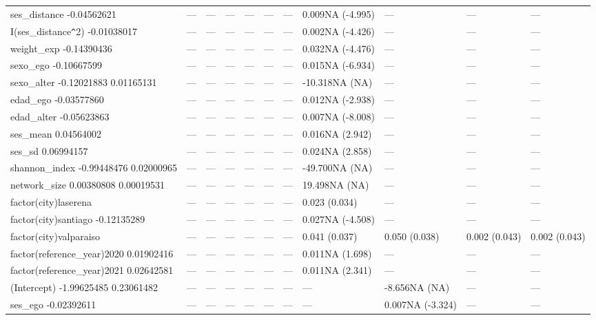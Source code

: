 \begin{table}[ht]
\begin{tabular}{lllllllllll}
  ses\_distance -0.04562621 & --- & --- & --- & --- & --- & --- & 0.009NA (-4.995) & --- & --- & --- \\ 
  I(ses\_distance\verb|^|2) -0.01038017 & --- & --- & --- & --- & --- & --- & 0.002NA (-4.426) & --- & --- & --- \\ 
  weight\_exp -0.14390436 & --- & --- & --- & --- & --- & --- & 0.032NA (-4.476) & --- & --- & --- \\ 
  sexo\_ego -0.10667599 & --- & --- & --- & --- & --- & --- & 0.015NA (-6.934) & --- & --- & --- \\ 
  sexo\_alter -0.12021883 0.01165131 & --- & --- & --- & --- & --- & --- & -10.318NA (NA) & --- & --- & --- \\ 
  edad\_ego -0.03577860 & --- & --- & --- & --- & --- & --- & 0.012NA (-2.938) & --- & --- & --- \\ 
  edad\_alter -0.05623863 & --- & --- & --- & --- & --- & --- & 0.007NA (-8.008) & --- & --- & --- \\ 
  ses\_mean 0.04564002 & --- & --- & --- & --- & --- & --- & 0.016NA (2.942) & --- & --- & --- \\ 
  ses\_sd 0.06994157 & --- & --- & --- & --- & --- & --- & 0.024NA (2.858) & --- & --- & --- \\ 
  shannon\_index -0.99448476 0.02000965 & --- & --- & --- & --- & --- & --- & -49.700NA (NA) & --- & --- & --- \\ 
  network\_size 0.00380808 0.00019531 & --- & --- & --- & --- & --- & --- & 19.498NA (NA) & --- & --- & --- \\ 
  factor(city)laserena & --- & --- & --- & --- & --- & --- & 0.023 (0.034) & --- & --- & --- \\ 
  factor(city)santiago -0.12135289 & --- & --- & --- & --- & --- & --- & 0.027NA (-4.508) & --- & --- & --- \\ 
  factor(city)valparaiso & --- & --- & --- & --- & --- & --- & 0.041 (0.037) & 0.050 (0.038) & 0.002 (0.043) & 0.002 (0.043) \\ 
  factor(reference\_year)2020 0.01902416 & --- & --- & --- & --- & --- & --- & 0.011NA (1.698) & --- & --- & --- \\ 
  factor(reference\_year)2021 0.02642581 & --- & --- & --- & --- & --- & --- & 0.011NA (2.341) & --- & --- & --- \\ 
  (Intercept) -1.99625485 0.23061482 & --- & --- & --- & --- & --- & --- & --- & -8.656NA (NA) & --- & --- \\ 
  ses\_ego -0.02392611 & --- & --- & --- & --- & --- & --- & --- & 0.007NA (-3.324) & --- & --- \\ 

\end{tabular}
\end{table}
